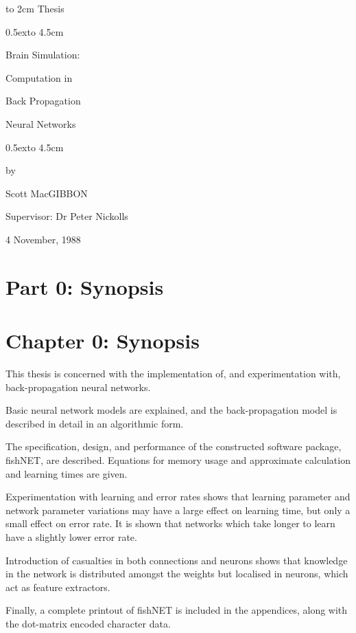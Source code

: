 \documentclass[12pt]{report}
\begin{document}
\titlepage
\vbox to 2cm {}
\medrm
{Thesis}

\bigbf
%
{\raise0.5ex\hbox to 4.5cm{\hrulefill}}

{Brain Simulation:}

{Computation in}

{Back Propagation}

{Neural Networks}

{\raise0.5ex\hbox to 4.5cm{\hrulefill}}

\medrm
{by}

\bigrm
{Scott MacGIBBON}

\medrm
{Supervisor: Dr Peter Nickolls}

\tenrm
{4 November, 1988}








\chapter*{Part 0: Synopsis}

\chapter{Chapter 0: Synopsis}

This thesis is concerned with the implementation of, and
experimentation with, back-propagation neural networks.

Basic neural network models are explained, and the back-propagation model is
described in detail in an algorithmic form.

The specification, design, and performance of the constructed software 
package, fishNET, are described.
Equations for memory usage and approximate calculation and learning
times are given.

Experimentation with learning and error rates shows that learning
parameter and network parameter variations may have a large effect
on learning time, but only a small effect on error rate.
It is shown that networks which take longer to learn have a
slightly lower error rate.

Introduction of casualties in both connections and neurons shows
that knowledge in the network is distributed amongst the weights but
localised in neurons, which act as feature extractors.

Finally, a complete printout of fishNET is included in the
appendices, along with the dot-matrix encoded character data.
\end{document}
